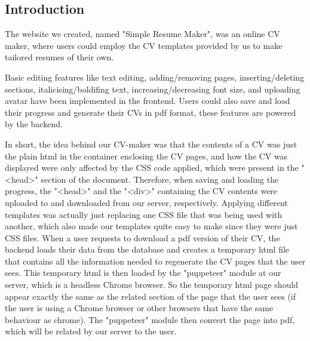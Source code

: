 \documentclass[11pt]{article}
\begin{document}
\begin{spacing}{1.0}
	\tableofcontents
	\newpage	
	\section{Introduction}
	
	\hspace{\parindent}The website we created, named "Simple Resume Maker", was an online CV maker, where users could employ the CV templates provided by us to make tailored resumes of their own. 
	
	Basic editing features like text editing, adding/removing pages, inserting/deleting sections, italicising/boldifing text, increasing/decreasing font size, and uploading avatar have been implemented in the frontend. Users could also save and load their progress and generate their CVs in pdf format, these features are powered by the backend.
	
	In short, the idea behind our CV-maker was that the contents of a CV was just the plain html in the container enclosing the CV pages, and how the CV was displayed were only affected by the CSS code applied, which were present in the "\textless head\textgreater" section of the document. Therefore, when saving and loading the progress, the "\textless head\textgreater" and the "\textless div\textgreater" containing the CV contents were uploaded to and downloaded from our server, respectively. Applying different templates was actually just replacing one CSS file that was being used with another, which also made our templates quite easy to make since they were just CSS files. When a user requests to download a pdf version of their CV, the backend loads their data from the database and creates a temporary html file that contains all the information needed to regenerate the CV pages that the user sees. This temporary html is then loaded by the "puppeteer" module at our server, which is a headless Chrome browser. So the temporary html page should appear exactly the same as the related section of the page that the user sees (if the user is using a Chrome browser or other browsers that have the same behaviour as chrome). The "puppeteer" module then convert the page into pdf, which will be related by our server to the user.
	

\end{spacing}
\end{document}
